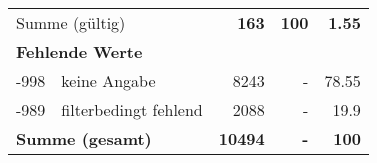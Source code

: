 \begin{longtable}{lXrrr}
     \midrule
     \multicolumn{2}{l}{Summe (gültig)} &
       \textbf{\num{163}} &
     \textbf{\num{100}} &
       \textbf{\num[round-mode=places,round-precision=2]{1.55}} \\
     \multicolumn{5}{l}{\textbf{Fehlende Werte}}\\
       -998 &
       keine Angabe &
         \num{8243} &
        - &
         \num[round-mode=places,round-precision=2]{78.55} \\
       -989 &
       filterbedingt fehlend &
         \num{2088} &
        - &
         \num[round-mode=places,round-precision=2]{19.9} \\
     \midrule
     \multicolumn{2}{l}{\textbf{Summe (gesamt)}} &
          \textbf{\num{10494}} &
        \textbf{-} &
        \textbf{\num{100}} \\
     \bottomrule
     \end{longtable}
     
